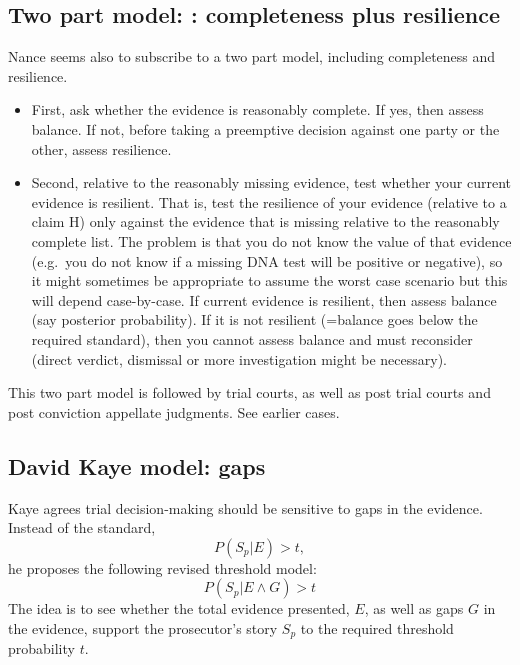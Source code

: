 \documentclass[
  10pt,
  dvipsnames,enabledeprecatedfontcommands]{scrartcl}
\begin{document}
\hypertarget{two-part-model-completeness-plus-resilience}{%
\subsection{Two part model: : completeness plus
resilience}\label{two-part-model-completeness-plus-resilience}}

Nance seems also to subscribe to a two part model, including
completeness and resilience.

\begin{itemize}
\item
  First, ask whether the evidence is reasonably complete. If yes, then
  assess balance. If not, before taking a preemptive decision against
  one party or the other, assess resilience.
\item
  Second, relative to the reasonably missing evidence, test whether your
  current evidence is resilient. That is, test the resilience of your
  evidence (relative to a claim H) only against the evidence that is
  missing relative to the reasonably complete list. The problem is that
  you do not know the value of that evidence (e.g.~you do not know if a
  missing DNA test will be positive or negative), so it might sometimes
  be appropriate to assume the worst case scenario but this will depend
  case-by-case. If current evidence is resilient, then assess balance
  (say posterior probability). If it is not resilient (=balance goes
  below the required standard), then you cannot assess balance and must
  reconsider (direct verdict, dismissal or more investigation might be
  necessary).
\end{itemize}

This two part model is followed by trial courts, as well as post trial
courts and post conviction appellate judgments. See earlier cases.

\hypertarget{david-kaye-model-gaps}{%
\subsection{David Kaye model: gaps}\label{david-kaye-model-gaps}}

Kaye agrees trial decision-making should be sensitive to gaps in the
evidence. Instead of the standard, \[P(S_p | E)>t,\] he proposes the
following revised threshold model: \[P(S_p | E \wedge G)>t\] The idea is
to see whether the total evidence presented, \(E\), as well as gaps
\(G\) in the evidence, support the prosecutor's story \(S_p\) to the
required threshold probability \(t\).
\end{document}
